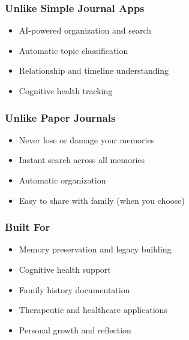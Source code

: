 \documentclass[11pt,letterpaper]{article}
\begin{document}
\subsubsection{Unlike Simple Journal Apps}
\begin{itemize}[leftmargin=*]
    \item \textcolor{secondarygreen}{\checkmark} AI-powered organization and search
    \item \textcolor{secondarygreen}{\checkmark} Automatic topic classification
    \item \textcolor{secondarygreen}{\checkmark} Relationship and timeline understanding
    \item \textcolor{secondarygreen}{\checkmark} Cognitive health tracking
\end{itemize}

\subsubsection{Unlike Paper Journals}
\begin{itemize}[leftmargin=*]
    \item \textcolor{secondarygreen}{\checkmark} Never lose or damage your memories
    \item \textcolor{secondarygreen}{\checkmark} Instant search across all memories
    \item \textcolor{secondarygreen}{\checkmark} Automatic organization
    \item \textcolor{secondarygreen}{\checkmark} Easy to share with family (when you choose)
\end{itemize}

\subsubsection{Built For}
\begin{itemize}[leftmargin=*]
    \item \textcolor{secondarygreen}{\checkmark} Memory preservation and legacy building
    \item \textcolor{secondarygreen}{\checkmark} Cognitive health support
    \item \textcolor{secondarygreen}{\checkmark} Family history documentation
    \item \textcolor{secondarygreen}{\checkmark} Therapeutic and healthcare applications
    \item \textcolor{secondarygreen}{\checkmark} Personal growth and reflection
\end{itemize}
\end{document}
